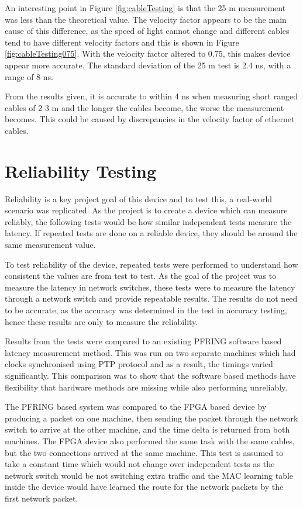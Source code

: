 An interesting point in Figure \ref{fig:cableTesting} is that the 25 m measurement was less than the theoretical 
value. The velocity factor appears to be the main cause of this difference, as the speed of light cannot change and 
different cables tend to have different velocity factors and this is shown in Figure \ref{fig:cableTesting075}. With 
the velocity factor altered to 0.75, this makes device appear more accurate. The standard deviation of the 25 m test 
is 2.4 ns, with a range of 8 ns.

From the results given, it is accurate to within 4 ns when measuring short ranged cables of 2-3 m and the longer the 
cables become, the worse the measurement becomes. This could be caused by discrepancies in the velocity factor of 
ethernet cables.

\section{Reliability Testing}

Reliability is a key project goal of this device and to test this, a real-world scenario was replicated. As the 
project is to create a device which can measure reliably, the following tests would be how similar independent tests 
measure the latency. If repeated tests are done on a reliable device, they should be around the same measurement 
value.

To test reliability of the device, repeated tests were performed to understand how consistent the values are from 
test to test. As the goal of the project was to measure the latency in network switches, these tests were to measure 
the latency through a network switch and provide repeatable results. The results do not need to be accurate, as the 
accuracy was determined in the test in accuracy testing, hence these results are only to measure the reliability. 

Results from the tests were compared to an existing PF\textunderscore RING software based latency measurement method.
This was run on two separate machines which had clocks synchronised using PTP protocol and as a result, the timings 
varied significantly. This comparison was to show that the software based methods have flexibility that hardware 
methods are missing while also performing unreliably. 

The PF\textunderscore RING based system was compared to the FPGA based device by producing a packet on one machine, 
then sending the packet through the network switch to arrive at the other machine, and the time delta is returned 
from both machines. The FPGA device also performed the same task with the same cables, but the two connections 
arrived at the same machine. This test is assumed to take a constant time which would not change over independent 
tests as the network switch would be not switching extra traffic and the MAC learning table inside the device would 
have learned the route for the network packets by the first network packet. 

